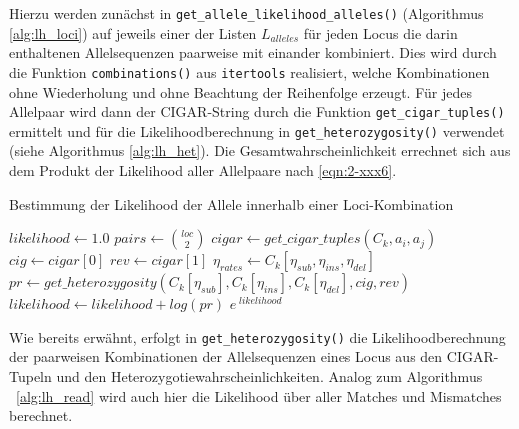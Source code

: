 Hierzu werden zunächst in \lstinline|get_allele_likelihood_alleles()| (Algorithmus \ref{alg:lh_loci}) auf jeweils einer der Listen $L_{alleles}$ für jeden Locus die darin enthaltenen Allelsequenzen paarweise mit einander kombiniert. Dies wird durch die Funktion \lstinline|combinations()| aus \lstinline|itertools| realisiert, welche Kombinationen ohne Wiederholung und ohne Beachtung der Reihenfolge erzeugt. Für jedes Allelpaar wird dann der CIGAR-String durch die Funktion \lstinline|get_cigar_tuples()| ermittelt und für die Likelihoodberechnung in \lstinline|get_heterozygosity()| verwendet (siehe Algorithmus \ref{alg:lh_het}). Die Gesamtwahrscheinlichkeit errechnet sich aus dem Produkt der Likelihood aller Allelpaare nach \ref{eqn:2-xxx6}.

\begin{algorithm}[H]
	\caption{Bestimmung der Likelihood der Allele innerhalb einer Loci-Kombination}  \label{alg:lh_loci}
	\begin{algorithmic}[1]	
		\State $ likelihood \gets 1.0 $
		    \State $ pairs \gets \binom{loc}{2}$
		    \State $cigar \gets get\_cigar\_tuples(C_{k}, a_{i}, a_{j})$  
			        \State $cig \gets cigar[0]$
			        \State $rev \gets cigar[1]$
			        \State $ \eta_{rates} \gets C_{k}[\eta_{sub}, \eta_{ins}, \eta_{del}]$
			        \State $pr \gets get\_heterozygosity(C_{k}[\eta_{sub}], C_{k}[\eta_{ins}], C_{k}[\eta_{del}], cig, rev)$  
			    	\State $ likelihood \gets likelihood + log(pr)$    
			    \EndIf
			\EndFor
		\EndFor
		\State \Return $ e^{\;likelihood} $
		\EndFunction
	\end{algorithmic}
\end{algorithm}

Wie bereits erwähnt, erfolgt in \lstinline|get_heterozygosity()| die Likelihoodberechnung der paarweisen Kombinationen der Allelsequenzen eines Locus aus den CIGAR-Tupeln und den Heterozygotiewahrscheinlichkeiten. Analog zum Algorithmus ~\ref{alg:lh_read} wird auch hier die Likelihood über aller Matches und Mismatches berechnet.\\

